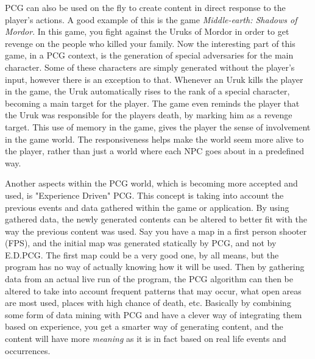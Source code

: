 PCG can also be used on the fly to create content in direct response to the player's actions. A good example of this is the game \textit{Middle-earth: Shadows of Mordor}\cite{game:shadowMordor}. In this game, you fight against the Uruks of Mordor in order to get revenge on the people who killed your family. 
Now the interesting part of this game, in a PCG context, is the generation of special adversaries for the main character. Some of these characters are simply generated without the player's input, however there is an exception to that. Whenever an Uruk kills the player in the game, the Uruk automatically rises to the rank of a special character, becoming a main target for the player. The game even reminds the player that the Uruk was responsible for the players death, by marking him as a revenge target.
This use of memory in the game, gives the player the sense of involvement in the game world. The responsiveness helps make the world seem more alive to the player, rather than just a world where each NPC goes about in a predefined way.

Another aspects within the PCG world, which is becoming more accepted and used, is "Experience Driven" PCG\cite{art:exppcg}. This concept is taking into account the previous events and data gathered within the game or application. By using gathered data, the newly generated contents can be altered to better fit with the way the previous content was used. Say you have a map in a first person shooter (FPS), and the initial map was generated statically by PCG, and not by E.D.PCG. The first map could be a very good one, by all means, but the program has no way of actually knowing how it will be used. Then by gathering data from an actual live run of the program, the PCG algorithm can then be altered to take into account frequent patterns that may occur, what open areas are most used, places with high chance of death, etc. Basically by combining some form of data mining with PCG and have a clever way of integrating them based on experience, you get a smarter way of generating content, and the content will have more \textit{meaning} as it is in fact based on real life events and occurrences.

